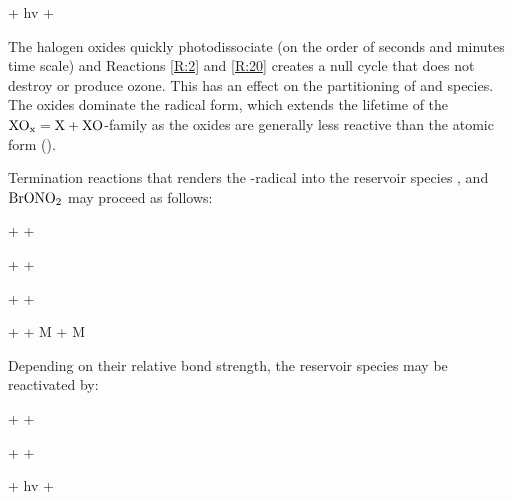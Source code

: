 \begin{reaction}
     + hv \rightarrow {} + 
    \label{R:20}
\end{reaction}

The halogen oxides quickly photodissociate (on the order of seconds and minutes time scale) and Reactions \ref{R:2} and \ref{R:20} creates a null cycle that does not destroy or produce ozone. This has an effect on the partitioning of  and  species. The oxides dominate the radical form, which extends the lifetime of the $\mathrm{XO_x} = \mathrm{X} + \mathrm{XO}$-family as the oxides are generally less reactive than the atomic form (\cite{Simpson2015}). 

\medskip

Termination reactions that renders the -radical into the reservoir species ,  and $\mathrm{BrONO_2}$ may proceed as follows: 

\begin{reaction}
     +  \rightarrow {} + 
    \label{R:6} 
\end{reaction}

\begin{reaction}
     +  \rightarrow {} + 
    \label{R:17}
\end{reaction}


\begin{reaction}
     +  \rightarrow {} + 
    \label{R:16}
\end{reaction}

\begin{reaction}
     +  + M \rightarrow {} + M
    \label{R:9}
\end{reaction}

Depending on their relative bond strength, the reservoir species may be reactivated by: 


\begin{reaction}
     +  \rightarrow {} + 
    \label{R:14}
\end{reaction}



\begin{reaction}
     +    + 
    \label{R:13}
\end{reaction}

\begin{reaction}
     + hv \rightarrow {} + 
    \label{R:18}
\end{reaction}



